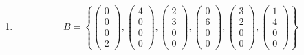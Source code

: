 \documentclass[a4paper]{scrartcl}
\begin{document}
\begin{enumerate}
\begin{proof}
\begin{enumerate}
            \end{enumerate}
        \end{proof}

    \item
        \begin{equation}
            B = \left\{
                \begin{pmatrix}
                    0 \\ 0 \\ 0 \\ 2
                \end{pmatrix}
                ,
                \begin{pmatrix}
                    4 \\ 0 \\ 0 \\ 0
                \end{pmatrix}
                ,
                \begin{pmatrix}
                    2 \\ 3 \\ 0 \\ 0
                \end{pmatrix}
                ,
                \begin{pmatrix}
                    0 \\ 6 \\ 0 \\ 0
                \end{pmatrix}
                ,
                \begin{pmatrix}
                    3 \\ 2 \\ 0 \\ 0
                \end{pmatrix}
                ,
                \begin{pmatrix}
                    1 \\ 4 \\ 0 \\ 0
                \end{pmatrix}
            \right\}
        \end{equation}

\end{enumerate}
\end{document}
